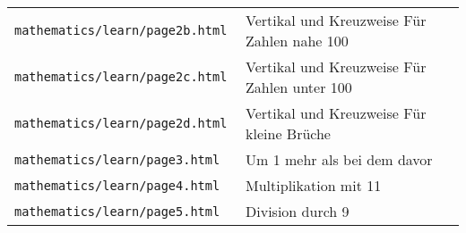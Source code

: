 \begin{tabular}{ | l | l | }
  \texttt{mathematics/learn/page2b.html } & Vertikal und Kreuzweise Für Zahlen nahe 100 \\
  \texttt{mathematics/learn/page2c.html } & Vertikal und Kreuzweise Für Zahlen unter 100 \\
  \texttt{mathematics/learn/page2d.html } & Vertikal und Kreuzweise Für kleine Brüche \\
  \texttt{mathematics/learn/page3.html  } & Um 1 mehr als bei dem davor \\
  \texttt{mathematics/learn/page4.html  } & Multiplikation mit 11 \\
  \texttt{mathematics/learn/page5.html  } & Division durch 9 \\
\end{tabular}


